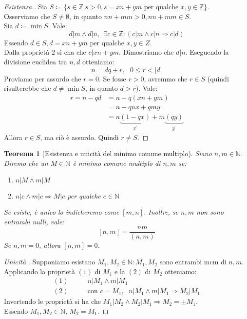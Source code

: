 \documentclass[12pt,twoside]{article}
\newcommand{\N}{\mathbb{N}}
\newcommand{\Z}{\mathbb{Z}}
\newcommand{\implica}{\Longrightarrow}
\newcommand{\pr}{\prime}
\newcommand{\pq}{\text{ per qualche }}
\renewcommand\qedsymbol{$\blacksquare$}
\newtheorem{theorem}{Teorema}
\begin{document}
\renewcommand\qedsymbol{$\blacksquare$}
\begin{proof}[Esistenza.]
Sia $S \coloneqq \{ s \in \Z | s > 0, s = xn + ym \text{ per qualche } x, y \in \Z\}$.
\\Osserviamo che $S \ne \emptyset$, in quanto $nn + mm > 0, nn + mm \in S$.
\\Sia $d \coloneqq \min S$. Vale:
$$ d | m \land d | n ,\ \ \exists c \in \Z : (c | m \land c | n \implica c | d)$$
Essendo $d \in S, d = xn+ym \pq x, y \in Z$.
\\Dalla proprietà 2 si cha che $c | xn + ym$. Dimostriamo che $d | n$. Eseguendo la divisione euclidea tra $n, d$ otteniamo:
$$n = dq + r, \text{ } 0 \le r < |d|$$
Proviamo per assurdo che $r = 0$. Se fosse $r > 0$, avremmo che $r \in S$ (quindi risulterebbe che $d \ne \min S$, in quanto $d > r$). Vale:
\begin{align*} 
r = n - qd &= n - q(xn+ym) \\
&= n - qnx + qmy \\
&= n\underbrace{(1-qx)}_{x^{\pr}} + m\underbrace{(qy)}_{y^{\pr}}
\end{align*}
Allora $r \in S$, ma ciò è assurdo. Quindi $r \ne S$.
\end{proof}

\begin{theorem}[Esistenza e unicità del minimo comune multiplo]
Siano $n, m \in \N$. Diremo che un $M \in \N$ è minimo comune multiplo di $n, m$ se:
\begin{enumerate}
\item$n | M \land m | M $
\item$n | c \land m | c \implica M | c$ per qualche $c \in \N$
\end{enumerate}
Se esiste, è unico lo indicheremo come $[m, n]$. Inoltre, se $n, m$ non sono entrambi nulli, vale:
$$[n, m] = \frac{nm}{(n, m)}$$
Se $n, m = 0$, allora $ [n, m] = 0$.
\end{theorem}

\renewcommand\qedsymbol{$\square$}
\begin{proof}[Unicità.]
Supponiamo esistano $M_1, M_2 \in \N : M_1, M_2$ sono entrambi mcm di $n, m$.
Applicando la proprietà $(1)$ di $M_1$ e la $(2)$ di $M_2$ otteniamo:
\begin{align*}
(1)\qquad& n | M_1 \land m | M_1 \\
(2)\qquad&\text{con } c = M_1 \text{, } \ \ n | M_1 \land m | M_1 \implica M_2 | M_1
\end{align*}
Invertendo le proprietà si ha che $M_1 | M_2 \land M_2 | M_1 \implica M_2 = \pm M_1$.
\\Essendo $M_1, M_2 \in \N$, $M_2 = M_1$.
\end{proof}
\end{document}
